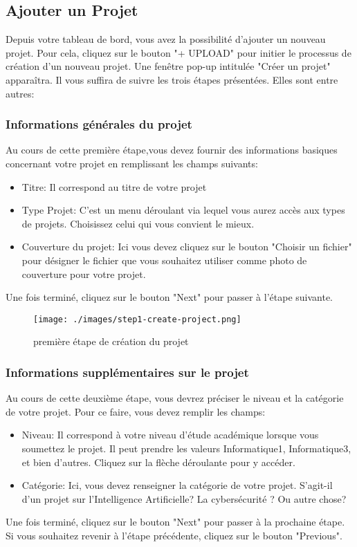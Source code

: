 \documentclass[12pt]{article}
\begin{document}
\medskip
\subsection{Ajouter un Projet}
Depuis votre tableau de bord, vous avez la possibilité d’ajouter un nouveau projet. Pour cela, cliquez sur le bouton "+ UPLOAD" pour initier le processus de création d'un nouveau projet. Une fenêtre pop-up intitulée "Créer un projet" apparaîtra. Il vous suffira de suivre les trois étapes présentées. Elles sont entre autres:

\medskip
\subsubsection{Informations générales du projet}
Au cours de cette première étape,vous devez fournir des informations basiques concernant votre projet en remplissant les champs suivants:
\begin{itemize}
    \item Titre: Il correspond au titre de votre projet
    \item Type Projet: C'est un menu déroulant via lequel vous aurez accès aux types de projets. Choisissez celui qui vous convient le mieux.
    \item Couverture du projet: Ici vous devez cliquez sur le bouton "Choisir un fichier" pour désigner le fichier que vous souhaitez utiliser comme photo de couverture pour votre projet.
\end{itemize}
    Une fois terminé, cliquez sur le bouton "Next" pour passer à l'étape suivante.
  
\begin{figure}[h!]
    \centering
    \texttt{[image: ./images/step1-create-project.png]}
    \caption{première étape de création du projet}
    \label{fig:première étape de création du projet}
\end{figure}    

\smallskip
\subsubsection{Informations supplémentaires sur le projet}
Au cours de cette deuxième étape, vous devrez préciser le niveau et la catégorie de votre projet. Pour ce faire, vous devez remplir les champs:
\begin{itemize}
    \item Niveau: Il correspond à votre niveau d'étude académique lorsque vous soumettez le projet. Il peut prendre les valeurs Informatique1, Informatique3, et bien d'autres. Cliquez sur la flèche déroulante pour y accéder.
    \item Catégorie: Ici, vous devez renseigner la catégorie de votre projet. S'agit-il d'un projet sur l'Intelligence Artificielle? La cybersécurité ? Ou autre chose?
\end{itemize} 
Une fois terminé, cliquez sur le bouton "Next" pour passer à la prochaine étape.
Si vous souhaitez revenir à l'étape précédente, cliquez sur le bouton "Previous".
\end{document}
